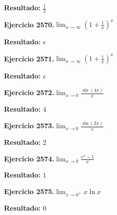 \documentclass[10pt,a4paper]{article}
\begin{document}
\begin{solbox}
\textbf{Resultado:} \(\displaystyle \frac{1}{2}\)
\end{solbox}

\begin{ejbox}
\textbf{Ejercicio 2570.}\quad $\lim_{x\to \infty} \left(1+\frac{1}{x}\right)^x$
\end{ejbox}

\begin{solbox}
\textbf{Resultado:} \(\displaystyle e\)
\end{solbox}

\newpage
\begin{ejbox}
\textbf{Ejercicio 2571.}\quad $\lim_{x\to \infty} \left(1+\frac{1}{x}\right)^x$
\end{ejbox}

\begin{solbox}
\textbf{Resultado:} \(\displaystyle e\)
\end{solbox}

\begin{ejbox}
\textbf{Ejercicio 2572.}\quad $\lim_{x\to 0} \frac{\sin(4x)}{x}$
\end{ejbox}

\begin{solbox}
\textbf{Resultado:} \(\displaystyle 4\)
\end{solbox}

\begin{ejbox}
\textbf{Ejercicio 2573.}\quad $\lim_{x\to 0} \frac{\sin(2x)}{x}$
\end{ejbox}

\begin{solbox}
\textbf{Resultado:} \(\displaystyle 2\)
\end{solbox}

\newpage
\begin{ejbox}
\textbf{Ejercicio 2574.}\quad $\lim_{x\to 0} \frac{e^x-1}{x}$
\end{ejbox}

\begin{solbox}
\textbf{Resultado:} \(\displaystyle 1\)
\end{solbox}

\begin{ejbox}
\textbf{Ejercicio 2575.}\quad $\lim_{x\to 0^+} x\ln x$
\end{ejbox}

\begin{solbox}
\textbf{Resultado:} \(\displaystyle 0\)
\end{solbox}
\end{document}
